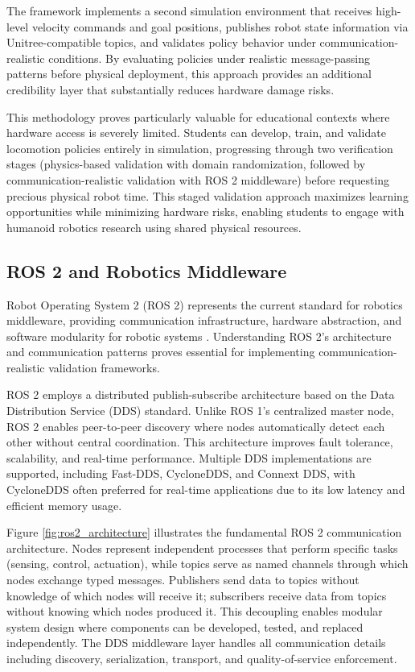 \documentclass[12pt,a4paper]{article}
\begin{document}
The framework implements a second simulation environment that receives high-level velocity commands and goal positions, publishes robot state information via Unitree-compatible topics, and validates policy behavior under communication-realistic conditions. By evaluating policies under realistic message-passing patterns before physical deployment, this approach provides an additional credibility layer that substantially reduces hardware damage risks.

This methodology proves particularly valuable for educational contexts where hardware access is severely limited. Students can develop, train, and validate locomotion policies entirely in simulation, progressing through two verification stages (physics-based validation with domain randomization, followed by communication-realistic validation with ROS 2 middleware) before requesting precious physical robot time. This staged validation approach maximizes learning opportunities while minimizing hardware risks, enabling students to engage with humanoid robotics research using shared physical resources.

\subsection{ROS 2 and Robotics Middleware}

Robot Operating System 2 (ROS 2) represents the current standard for robotics middleware, providing communication infrastructure, hardware abstraction, and software modularity for robotic systems \parencite{ros2023documentation}. Understanding ROS 2's architecture and communication patterns proves essential for implementing communication-realistic validation frameworks.

ROS 2 employs a distributed publish-subscribe architecture based on the Data Distribution Service (DDS) standard. Unlike ROS 1's centralized master node, ROS 2 enables peer-to-peer discovery where nodes automatically detect each other without central coordination. This architecture improves fault tolerance, scalability, and real-time performance. Multiple DDS implementations are supported, including Fast-DDS, CycloneDDS, and Connext DDS, with CycloneDDS often preferred for real-time applications due to its low latency and efficient memory usage.

Figure \ref{fig:ros2_architecture} illustrates the fundamental ROS 2 communication architecture. Nodes represent independent processes that perform specific tasks (sensing, control, actuation), while topics serve as named channels through which nodes exchange typed messages. Publishers send data to topics without knowledge of which nodes will receive it; subscribers receive data from topics without knowing which nodes produced it. This decoupling enables modular system design where components can be developed, tested, and replaced independently. The DDS middleware layer handles all communication details including discovery, serialization, transport, and quality-of-service enforcement.
\end{document}
